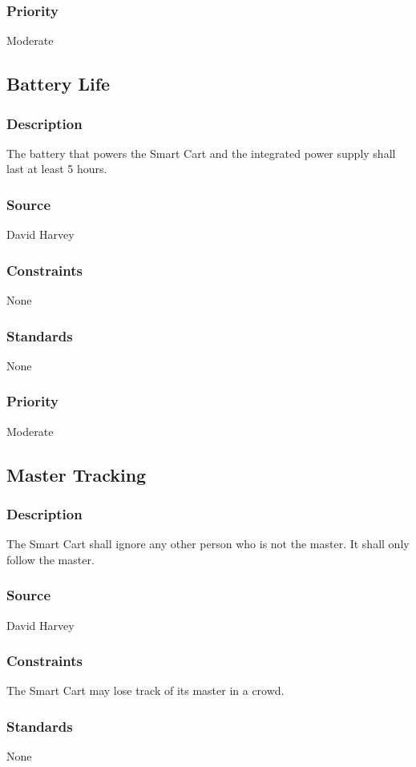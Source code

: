 \subsubsection{Priority}
Moderate


\subsection{Battery Life}
\subsubsection{Description}
The battery that powers the Smart Cart and the integrated power supply shall last at least 5 hours.
\subsubsection{Source}
David Harvey
\subsubsection{Constraints}
None
\subsubsection{Standards}
None
\subsubsection{Priority}
Moderate


\subsection{Master Tracking}
\subsubsection{Description}
The Smart Cart shall ignore any other person who is not the master. It shall only follow the master.
\subsubsection{Source}
David Harvey
\subsubsection{Constraints}
The Smart Cart may lose track of its master in a crowd.
\subsubsection{Standards}
None

